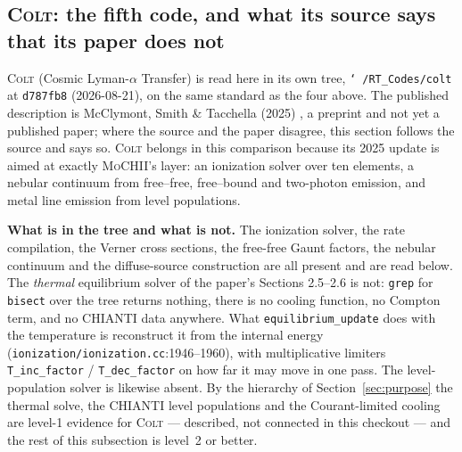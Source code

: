 \documentclass[english,a4paper]{my_memo}
\newcommand{\code}[1]{\texttt{#1}}
\newcommand{\MoCHII}{\textsc{MoCHII}}
\newcommand{\Colt}{\textsc{Colt}}
\begin{document}
\subsection{\Colt{}: the fifth code, and what its source says that its paper
does not}
\label{sec:colt}

\Colt{} (Cosmic Lyman-$\alpha$ Transfer) is read here in its own tree,
\code{\char`~/RT\_Codes/colt} at \code{d787fb8} (2026-08-21), on the same
standard as the four above.  The published description is McClymont, Smith
\& Tacchella (2025) \cite{mcclymont2025}, a preprint and not yet a
published paper; where the source and the paper disagree, this section
follows the source and says so.  \Colt{} belongs in this comparison
because its 2025 update is aimed at exactly \MoCHII{}'s layer: an
ionization solver over ten elements, a nebular continuum from free--free,
free--bound and two-photon emission, and metal line emission from level
populations.

\textbf{What is in the tree and what is not.}  The ionization solver, the
rate compilation, the Verner cross sections, the free-free Gaunt factors,
the nebular continuum and the diffuse-source construction are all present
and are read below.  The \emph{thermal} equilibrium solver of the paper's
Sections 2.5--2.6 is not: \code{grep} for \code{bisect} over the tree
returns nothing, there is no cooling function, no Compton term, and no
CHIANTI data anywhere.  What \code{equilibrium\_update} does with the
temperature is reconstruct it from the internal energy
(\code{ionization/\allowbreak ionization.cc}:1946--1960), with multiplicative limiters
\code{T\_inc\_factor} / \code{T\_dec\_factor} on how far it may move in one
pass.  The level-population solver is likewise absent.  By the hierarchy
of Section~\ref{sec:purpose} the thermal solve, the CHIANTI level
populations and the Courant-limited cooling are level-1 evidence for
\Colt{} --- described, not connected in this checkout --- and the rest of
this subsection is level~2 or better.
\end{document}
